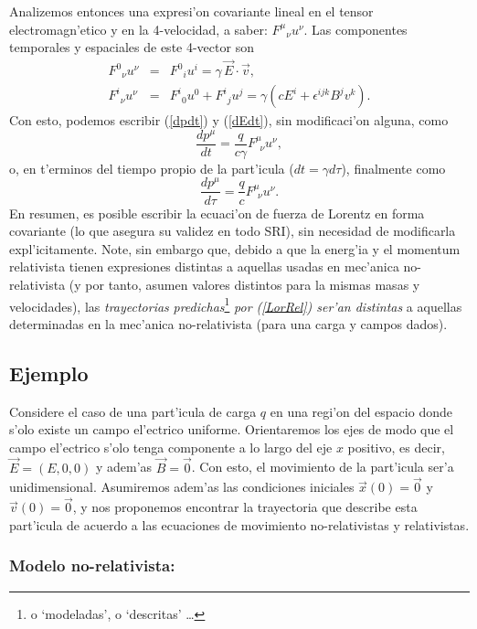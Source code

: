 Analizemos entonces una expresi'on covariante lineal en el tensor
electromagn'etico y en la 4-velocidad, a saber: $F^\mu{}_{\nu}u^\nu$. Las
componentes temporales y espaciales de este 4-vector son
\begin{eqnarray}
F^0{}_{\nu}u^\nu &=&F^0{}_{i}u^i=\gamma\, \vec{E}\cdot\vec{v} ,\\
F^i{}_{\nu}u^\nu &=&F^i{}_{0}u^0+F^i{}_{j}u^j=\gamma \left( c
E^i+\epsilon^{ijk}B^j v^k\right) .
\end{eqnarray}
Con esto, podemos escribir  (\ref{dpdt}) y (\ref{dEdt}), sin modificaci'on
alguna, como
\begin{equation}
\frac{dp^\mu }{dt}=\frac{q}{c\gamma}F^\mu _{\ \ \nu}u^\nu ,
\end{equation}
o, en t'erminos del tiempo propio de la part'icula ($dt=\gamma d\tau$),
finalmente como
\begin{equation}
\boxed{\frac{dp^\mu }{d\tau}=\frac{q}{c}F^\mu _{\ \ \nu}u^\nu .} \label{LorRel}
\end{equation}
En resumen, es posible escribir la ecuaci'on de fuerza de Lorentz en forma
covariante (lo que asegura su validez en todo SRI), sin necesidad de
modificarla expl'icitamente. Note, sin embargo que, debido a que la energ'ia y el momentum
relativista tienen expresiones distintas a aquellas usadas en mec'anica
no-relativista (y por tanto, asumen valores distintos para la mismas masas y
velocidades), las \textit{trayectorias} \textit{predichas}\footnote{o
`modeladas', o `descritas' \dots} \textit{por (\ref{LorRel}) ser'an distintas} a
aquellas determinadas en la mec'anica no-relativista (para una carga y campos
dados).

\subsection{Ejemplo}
Considere el caso de una part'icula de carga $q$ en una regi'on del espacio
donde s'olo existe un campo el'ectrico uniforme. Orientaremos los ejes de modo
que el campo el'ectrico s'olo tenga componente a lo largo del eje $x$ positivo,
es decir, $\vec{E}=(E,0,0)$ y adem'as $\vec{B}=\vec{0}$. Con esto, el movimiento
de la part'icula ser'a unidimensional. Asumiremos adem'as las condiciones
iniciales $\vec{x}(0)=\vec{0}$ y $\vec{v}(0)=\vec{0}$, y nos proponemos
encontrar la trayectoria que describe esta part'icula de acuerdo a las
ecuaciones de movimiento no-relativistas y relativistas.

\subsubsection{Modelo no-relativista:}


